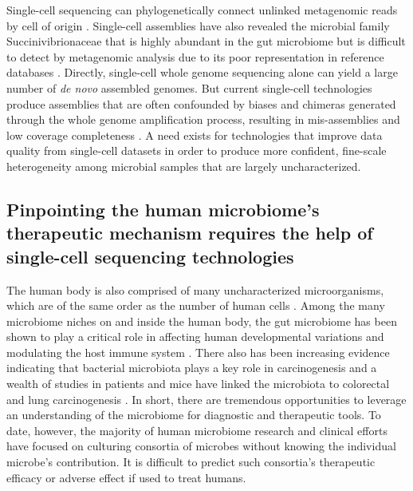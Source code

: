 Single-cell sequencing can phylogenetically connect unlinked metagenomic reads by cell of origin \cite{Rinke:2013bt}. Single-cell assemblies have also revealed the microbial family Succinivibrionaceae that is highly abundant in the gut microbiome but is difficult to detect by metagenomic analysis due to its poor representation in reference databases \cite{Xu:2016wt}. Directly, single-cell whole genome sequencing alone can yield a large number of \textit{de novo} assembled genomes. But current single-cell technologies produce assemblies that are often confounded by biases and chimeras generated through the whole genome amplification process, resulting in mis-assemblies and low coverage completeness \cite{Rodrigue:2009gc,VanderAa:2013jz}. A need exists for technologies that improve data quality from single-cell datasets in order to produce more confident, fine-scale heterogeneity among microbial samples that are largely uncharacterized. 

\subsection{Pinpointing the human microbiome's therapeutic mechanism requires the help of single-cell sequencing technologies}
The human body is also comprised of many uncharacterized microorganisms, which are of the same order as the number of human cells \cite{Sender:2016ei}. Among the many microbiome niches on and inside the human body, the gut microbiome has been shown to play a critical role in affecting human developmental variations \cite{Yatsunenko:2012gi} and modulating the host immune system \cite{GevaZatorsky:2017fy}. There also has been increasing evidence indicating that bacterial microbiota plays a key role in carcinogenesis \cite{Plottel:2011io} and a wealth of studies in patients and mice have linked the microbiota to colorectal and lung carcinogenesis \cite{Yoshimoto:2013ff,Uronis:2009es}. In short, there are tremendous opportunities to leverage an understanding of the microbiome for diagnostic and therapeutic tools. To date, however, the majority of human microbiome research and clinical efforts have focused on culturing consortia of microbes without knowing the individual microbe's contribution. It is difficult to predict such consortia's therapeutic efficacy or adverse effect if used to treat humans. 

